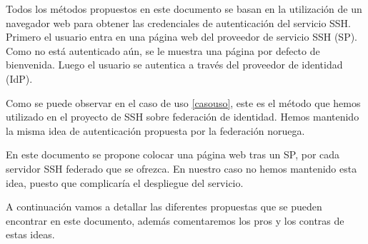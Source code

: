     Todos los métodos propuestos en este documento se basan en la
    utilización de un navegador web para obtener las credenciales
    de autenticación del servicio SSH. Primero el usuario entra en
    una página web del proveedor de servicio SSH (SP). Como no está
    autenticado aún, se le muestra una página por defecto de
    bienvenida. Luego el usuario se autentica a través del
    proveedor de identidad (IdP).

    Como se puede observar en el caso de uso \ref{casouso}, este es el
    método que hemos utilizado en el proyecto de SSH sobre federación
    de identidad. Hemos mantenido la misma idea de autenticación
    propuesta por la federación noruega.

    En este documento se propone colocar una página web tras un SP,
    por cada servidor SSH federado que se ofrezca. En nuestro caso no
    hemos mantenido esta idea, puesto que complicaría el despliegue del servicio.

    A continuación vamos a detallar las diferentes propuestas que se
    pueden encontrar en este documento, además comentaremos los pros y
    los contras de estas ideas.

